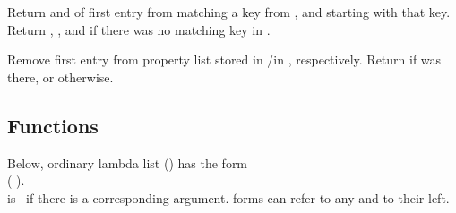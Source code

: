 \begin{LIST}{1cm}
  {
  Return  and  of first entry from 
  matching a key from , and  starting with that key. Return \retval{\NIL},
  \retvalii{\NIL}, and  \retvaliii{\NIL} if there was no matching key
  in .
  }

  {
  Remove first entry  from property list stored in
  /in , respectively. Return \retval{\T} if 
  was there, or \retval{\NIL} otherwise.
  }

\end{LIST}


\subsection{Functions}
\label{section:Functions}

\begin{flushleft}
  Below, ordinary lambda list () has the form\\
  (
  ).\\
   is \T\ if there is a corresponding
  argument.  forms can refer to any  and
   to their left.
\end{flushleft}

